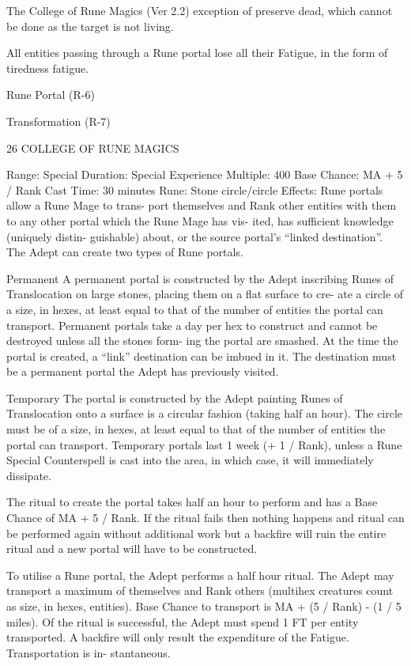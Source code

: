 \begin{Chapter}{The College of Rune Magics (Ver 2.2)}
exception  of  preserve  dead,  which  cannot be  done 
as the target is not living. 

All  entities  passing  through  a  Rune  portal  lose  all 
their Fatigue, in the form of tiredness fatigue. 

Rune Portal (R-6) 

Transformation (R-7) 

26 COLLEGE OF RUNE MAGICS 

Range: Special 
Duration: Special 
Experience Multiple: 400 
Base Chance: MA + 5 / Rank 
Cast Time: 30 minutes 
Rune: Stone circle/circle 
Effects: Rune portals allow a Rune Mage to trans-
port themselves and Rank other entities with them 
to  any  other  portal  which  the  Rune  Mage  has  vis-
ited,  has  sufficient  knowledge  (uniquely  distin-
guishable)  about,  or  the  source  portal’s  “linked 
destination”.  The  Adept  can  create  two  types  of 
Rune portals. 

Permanent  A  permanent  portal  is  constructed  by 
the  Adept  inscribing  Runes  of  Translocation  on 
large stones, placing them on a flat surface to cre-
ate a circle of a size, in hexes, at least equal to that 
of  the  number  of  entities  the  portal  can  transport. 
Permanent  portals  take  a  day  per  hex  to  construct 
and cannot be destroyed unless all the stones form-
ing the portal are smashed. At the time the portal is 
created,  a  “link”  destination  can  be  imbued  in  it. 
The  destination  must  be  a  permanent  portal  the 
Adept has previously visited. 

Temporary  The  portal  is  constructed by  the  Adept 
painting Runes of Translocation onto a surface is a 
circular  fashion  (taking  half  an  hour).  The  circle 
must be of a size, in hexes, at least equal to that of 
the  number  of  entities  the  portal  can  transport. 
Temporary portals last 1 week (+ 1 / Rank), unless 
a Rune Special Counterspell is cast into the area, in 
which case, it will immediately dissipate. 

The ritual to create the portal takes half an hour to 
perform and has a Base Chance of MA + 5 / Rank. 
If  the  ritual  fails  then  nothing  happens  and  ritual 
can  be  performed  again  without  additional  work 
but a backfire will ruin the entire ritual and a new 
portal will have to be constructed. 

To utilise a Rune portal, the Adept performs a half 
hour  ritual.  The  Adept  may  transport  a  maximum 
of themselves and Rank others (multihex creatures 
count  as  size,  in  hexes,  entities).  Base  Chance  to 
transport is MA + (5 / Rank) - (1 / 5 miles). Of the 
ritual is successful, the Adept must spend 1 FT per 
entity  transported.  A  backfire  will  only  result  the 
expenditure  of  the  Fatigue.  Transportation  is  in-
stantaneous. 


\end{Chapter}

